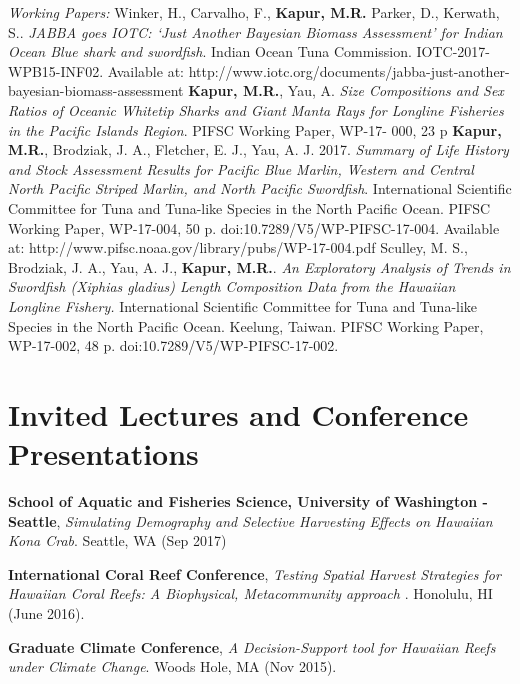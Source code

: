 \documentclass[10pt, letterpaper]{article}
\begin{document}
\noindent \textit{Working Papers:}\newline
\hangindent=0.5cm \noindent Winker, H., Carvalho, F., \textbf{Kapur, M.R.} Parker, D., Kerwath, S.. \textit{JABBA goes IOTC: ‘Just Another Bayesian Biomass Assessment’ for Indian Ocean Blue shark and swordfish}. Indian Ocean Tuna Commission. IOTC-2017-WPB15-INF02. Available at: http://www.iotc.org/documents/jabba-just-another-bayesian-biomass-assessment \newline
\hangindent=0.5cm \noindent  \textbf{Kapur, M.R.}, Yau, A. \textit{Size Compositions and Sex Ratios of Oceanic Whitetip Sharks and Giant Manta Rays for Longline Fisheries in the Pacific Islands Region}.  PIFSC Working Paper, WP-17- 000, 23 p  \newline
\hangindent=0.5cm \noindent  \textbf{Kapur, M.R.},  Brodziak, J. A., Fletcher, E. J., Yau, A. J. 2017. \textit{Summary of Life History and Stock Assessment Results for Pacific Blue Marlin, Western and Central North Pacific Striped Marlin, and North Pacific Swordfish}. International Scientific Committee for Tuna and Tuna-like Species in the North Pacific Ocean. PIFSC Working Paper, WP-17-004, 50 p. doi:10.7289/V5/WP-PIFSC-17-004. Available at: http://www.pifsc.noaa.gov/library/pubs/WP-17-004.pdf \newline
\hangindent=0.5cm \noindent  Sculley, M. S., Brodziak, J. A., Yau, A. J., \textbf{Kapur, M.R.}.  \textit{An Exploratory Analysis of Trends in Swordfish (Xiphias gladius) Length Composition Data from the Hawaiian Longline Fishery.} International Scientific Committee for Tuna and Tuna-like Species in the North Pacific Ocean. Keelung, Taiwan. PIFSC Working Paper, WP-17-002, 48 p. doi:10.7289/V5/WP-PIFSC-17-002. \\

\section*{Invited Lectures and Conference Presentations}

\noindent \textbf{School of Aquatic and Fisheries Science, University of Washington - Seattle}, \textit{Simulating Demography and Selective Harvesting Effects on Hawaiian Kona Crab}. Seattle, WA (Sep 2017)

\noindent \textbf{International Coral Reef Conference}, \textit{Testing Spatial Harvest Strategies for Hawaiian Coral Reefs: A Biophysical, Metacommunity approach }. Honolulu, HI (June 2016).

\noindent \textbf{Graduate Climate Conference}, \textit{A Decision-Support tool for Hawaiian Reefs under Climate Change}. Woods Hole, MA (Nov 2015).
\end{document}
